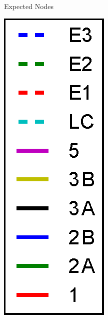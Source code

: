 \begin{figure}[h]
\begin{subfigure}{0.31\textwidth}
		\caption{\label{fig:2CMod}Expected Nodes}		
	\end{subfigure}
	\begin{subfigure}{0.07\textwidth}
		\includegraphics[width=\linewidth]{img/ExpectedNodes/2Cliques/legend.eps}
	\end{subfigure}
	

\end{figure}
